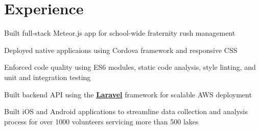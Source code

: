 \documentclass[letterpaper]{deedy-resume} %
\begin{document}
\begin{minipage}[t]{0.66\textwidth} %


\section{Experience}


\vspace{\topsep} %
\begin{tightitemize}
  \item Built full-stack Meteor.js app for school-wide fraternity rush management
  \item Deployed native applicaions using Cordova framework and responsive CSS
  \item Enforced code quality using ES6 modules, static code analysis, style linting, and unit and integration testing
\end{tightitemize}

\sectionspace %



\begin{tightitemize}
  \item Built backend API using the \textbf{\href{https://laravel.com/}{Laravel}} framework for scalable AWS deployment
  \item Built iOS and Android applications to streamline data collection and analysis process for over 1000 volunteers servicing more than 500 lakes
\end{tightitemize}

\sectionspace %



\end{minipage}
\end{document}
